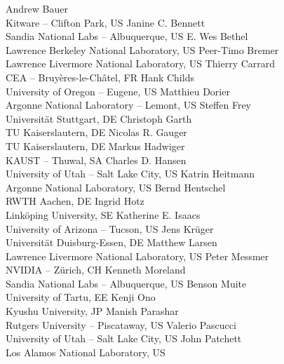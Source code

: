 \documentclass[a4paper,UKenglish]{dagrep}
\begin{document}
\begin{participants}
\participant Andrew Bauer \\ Kitware – Clifton Park, US
\participant Janine C. Bennett \\Sandia National Labs – Albuquerque, US
\participant E. Wes Bethel \\Lawrence Berkeley National Laboratory, US
\participant Peer-Timo Bremer \\ Lawrence Livermore National Laboratory, US
\participant Thierry Carrard \\ CEA – Bruyères-le-Châtel, FR
\participant Hank Childs \\ University of Oregon – Eugene, US
\participant Matthieu Dorier \\ Argonne National Laboratory – Lemont, US
\participant Steffen Frey \\ Universität Stuttgart, DE
\participant Christoph Garth \\ TU Kaiserslautern, DE 
\participant Nicolas R. Gauger \\ TU Kaiserslautern, DE
\participant Markus Hadwiger \\ KAUST – Thuwal, SA
\participant Charles D. Hansen \\ University of Utah – Salt Lake City, US
\participant Katrin Heitmann \\ Argonne National Laboratory, US
\participant Bernd Hentschel \\ RWTH Aachen, DE
\participant Ingrid Hotz \\ Linköping University, SE
\participant Katherine E. Isaacs \\ University of Arizona – Tucson, US
\participant Jens Krüger \\ Universität Duisburg-Essen, DE
\participant Matthew Larsen \\ Lawrence Livermore National Laboratory, US
\participant Peter Messmer \\ NVIDIA – Zürich, CH
\participant Kenneth Moreland \\ Sandia National Labs – Albuquerque, US
\participant Benson Muite \\ University of Tartu, EE
\participant Kenji Ono \\ Kyushu University, JP
\participant Manish Parashar \\ Rutgers University – Piscataway, US
\participant Valerio Pascucci \\ University of Utah – Salt Lake City, US
\participant John Patchett \\ Los Alamos National Laboratory, US

\end{participants}
\end{document}
